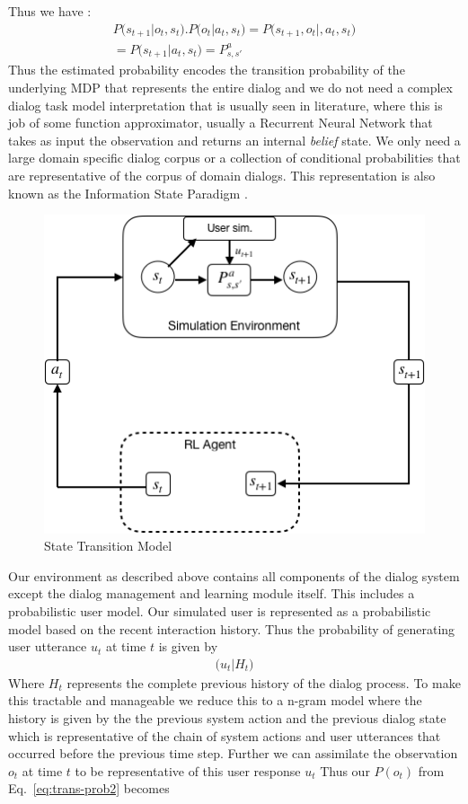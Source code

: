 \documentclass[14pt]{extarticle}
\numberwithin{equation}{section}
\begin{document}
	Thus we have :
	\begin{align}\label{eq:trans-prob2}
P\big(s_{t+1}|o_t, s_t\big).P\big(o_t | a_t,s_t\big) = P\big(s_{t+1}, o_t| ,a_t,s_t \big) \nonumber\\
 = P\big(s_{t+1} | a_t, s_t\big) = P_{s,s'}^a
\end{align}
Thus the estimated probability encodes the transition probability of the underlying MDP that represents the entire dialog and we do not need a complex dialog task model interpretation that is usually seen in literature, where this is job of some function approximator, usually a Recurrent Neural Network that takes as input the observation and returns an internal \textit{belief} state. We only need a large domain specific dialog corpus or a collection of conditional probabilities that are representative of the corpus of domain dialogs. This representation is also known as the Information State Paradigm \cite{Larsson:2000:ISD:973935.973943}. 
	\begin{figure}[h]
		\centering
		\includegraphics[scale=0.7]{state-trans}
		\caption{State Transition Model
			\label{state-trans}}
	\end{figure}
Our environment as described above contains all components of the dialog system except the dialog management and learning module itself. This includes a probabilistic user model. Our simulated user is represented as a probabilistic model based on the recent interaction history. Thus the probability of generating user utterance $u_t$ at time $t$ is given by 
\begin{align}
\big(u_t | H_t\big)
\end{align}
Where $H_t$ represents the complete previous history of the dialog process. To make this tractable and manageable we reduce this to a n-gram model \cite{Levin97astochastic} where the history is given by the the previous system action and the previous dialog state which is representative of the chain of system actions and user utterances that occurred before the previous time step. Further we can assimilate the observation $o_t$ at time $t$ to be representative of this user response $u_t$ Thus our $P(o_t)$ from Eq.\ \ref{eq:trans-prob2} becomes
\end{document}
